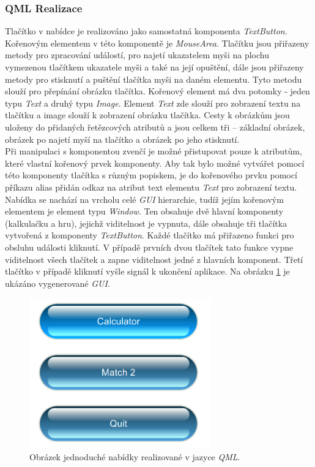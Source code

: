 \documentclass[11pt,twoside,a4paper]{book}
\begin{document}
\subsubsection{QML Realizace}
Tlačítko v nabídce je realizováno jako samostatná komponenta \textit{TextButton}.  Kořenovým elementem v této komponentě je \textit{MouseArea}. Tlačítku jsou přiřazeny metody pro zpracování událostí, pro najetí ukazatelem myši na plochu vymezenou tlačítkem ukazatele myši a také na její opuštění, dále jsou přiřazeny metody pro stisknutí a puštění tlačítka myši na daném elementu. Tyto metodu slouží pro přepínání obrázku tlačítka. Kořenový element má dva potomky - jeden typu \textit{Text} a druhý typu \textit{Image}. Element \textit{Text} zde slouží pro zobrazení textu na tlačítku a image slouží k zobrazení obrázku tlačítka. Cesty k obrázkům jsou uloženy do přidaných řetězcových atributů a jsou celkem tři – základní obrázek, obrázek po najetí myší na tlačítko a obrázek po jeho stisknutí. \\
Při manipulaci s komponentou zvenčí je možné přistupovat pouze k atributům, které vlastní kořenový prvek komponenty. Aby tak bylo možné vytvářet pomocí této komponenty tlačítka s různým popiskem, je do kořenového prvku pomocí příkazu alias přidán odkaz na atribut text elementu \textit{Text} pro zobrazení textu.
Nabídka se nachází na vrcholu celé \textit{GUI} hierarchie, tudíž jejím kořenovým elementem je element typu \textit{Window}. Ten obsahuje dvě hlavní komponenty (kalkulačku a hru), jejichž viditelnost je vypnuta, dále obsahuje tři tlačítka vytvořená z komponenty \textit{TextButton}. Každé tlačítko má přiřazeno funkci pro obsluhu události kliknutí. V případě prvních dvou tlačítek tato funkce vypne viditelnost všech tlačítek a zapne viditelnost jedné z hlavních komponent. Třetí tlačítko v případě kliknutí vyšle signál k ukončení aplikace. Na obrázku \ref{fig:outMenuQML} je ukázáno vygenerované \textit{GUI}.
\begin{figure}[!ht]
\begin{center}
  \includegraphics[width=0.7\textwidth]{qmlMenu}
\caption{{\label{fig:outMenuQML}}Obrázek jednoduché nabídky realizované v jazyce \textit{QML}.}
\end{center}
\end{figure}
\end{document}
